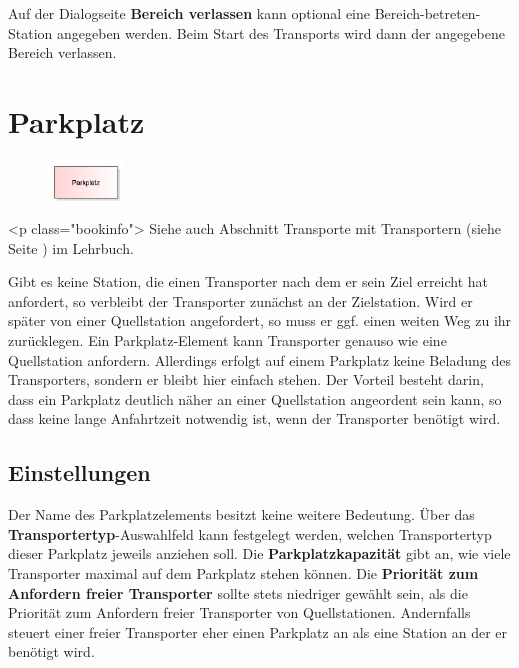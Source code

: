 Auf der Dialogseite \textbf{Bereich verlassen} kann optional eine
Bereich-betreten-Station angegeben werden. Beim Start des Transports
wird dann der angegebene Bereich verlassen.


\section{Parkplatz}
\label{ref:ModelElementTransportParking}

\begin{figure}
\vspace{-22pt}
\includegraphics[width=2cm]{imageModelElementTransportParking.png}
\vspace{-22pt}
\end{figure}

<p class="bookinfo">
Siehe auch Abschnitt Transporte mit Transportern (siehe Seite \pageref{ref:book:8.3.2}) im Lehrbuch.

Gibt es keine Station, die einen Transporter nach dem er sein Ziel erreicht hat
anfordert, so verbleibt der Transporter zunächst an der Zielstation. Wird er später
von einer Quellstation angefordert, so muss er ggf. einen weiten Weg zu ihr zurücklegen.
Ein Parkplatz-Element kann Transporter genauso wie eine Quellstation anfordern.
Allerdings erfolgt auf einem Parkplatz keine Beladung des Transporters, sondern er
bleibt hier einfach stehen. Der Vorteil besteht darin, dass ein Parkplatz deutlich
näher an einer Quellstation angeordent sein kann, so dass keine lange Anfahrtzeit
notwendig ist, wenn der Transporter benötigt wird.

\subsection*{Einstellungen}

Der Name des Parkplatzelements besitzt keine weitere Bedeutung.
Über das \textbf{Transportertyp}-Auswahlfeld kann festgelegt werden, welchen
Transportertyp dieser Parkplatz jeweils anziehen soll. Die \textbf{Parkplatzkapazität}
gibt an, wie viele Transporter maximal auf dem Parkplatz stehen können.
Die \textbf{Priorität zum Anfordern freier Transporter} sollte stets niedriger
gewählt sein, als die Priorität zum Anfordern freier Transporter von Quellstationen.
Andernfalls steuert einer freier Transporter eher einen Parkplatz an als eine
Station an der er benötigt wird.


